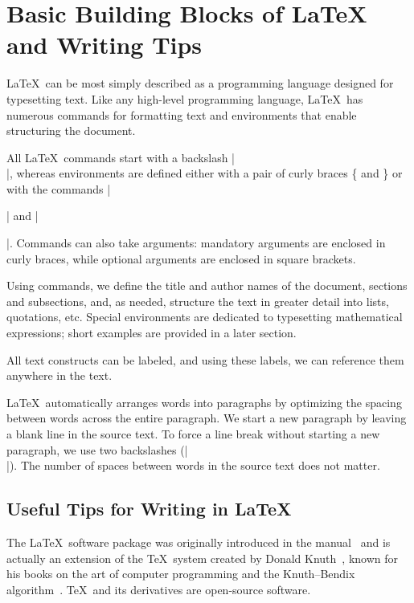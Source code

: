 \documentclass[9pt]{style/friteza}
\begin{document}
\section{Basic Building Blocks of \LaTeX{} and Writing Tips}
\label{sec:osnove}

\LaTeX\ can be most simply described as a programming language designed for typesetting text.
Like any high-level programming language, \LaTeX\ has numerous commands for formatting text and environments that enable structuring the document.

All \LaTeX\ commands start with a backslash \ltx|\\|, whereas environments are defined either with a pair of curly braces \{ and \} or with the commands \ltx|\begin{ }| and \ltx|\end{ }|.
Commands can also take arguments: mandatory arguments are enclosed in curly braces, while optional arguments are enclosed in square brackets.

Using commands, we define the title and author names of the document, sections and subsections, and, as needed, structure the text in greater detail into lists, quotations, etc.
Special environments are dedicated to typesetting mathematical expressions; short examples are provided in a later section.

All text constructs can be labeled, and using these labels, we can reference them anywhere in the text.

\LaTeX\ automatically arranges words into paragraphs by optimizing the spacing between words across the entire paragraph.
We start a new paragraph by leaving a blank line in the source text. To force a line break without starting a new paragraph, we use two backslashes (\ltx|\\|).
The number of spaces between words in the source text does not matter.

\subsection{Useful Tips for Writing in \LaTeX{}}

The \LaTeX\ software package was originally introduced in the manual~\cite{lamport} and is actually an extension of the \TeX\ system created by Donald Knuth~\cite{knuth},
known for his books on the art of computer programming
and the Knuth--Bendix algorithm~\cite{knuth1983simple}.
\TeX\ and its derivatives are open-source software.
\end{document}
